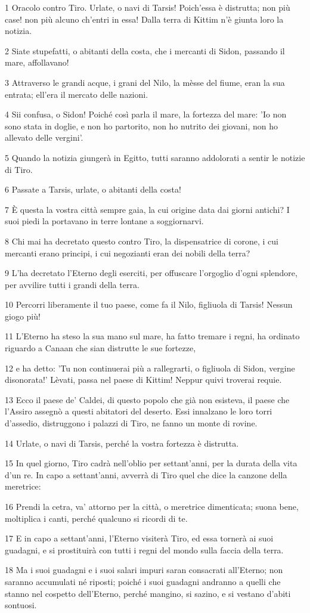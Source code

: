 \par 1 Oracolo contro Tiro. Urlate, o navi di Tarsis! Poich'essa è distrutta; non più case! non più alcuno ch'entri in essa! Dalla terra di Kittim n'è giunta loro la notizia.
\par 2 Siate stupefatti, o abitanti della costa, che i mercanti di Sidon, passando il mare, affollavano!
\par 3 Attraverso le grandi acque, i grani del Nilo, la mèsse del fiume, eran la sua entrata; ell'era il mercato delle nazioni.
\par 4 Sii confusa, o Sidon! Poiché così parla il mare, la fortezza del mare: 'Io non sono stata in doglie, e non ho partorito, non ho nutrito dei giovani, non ho allevato delle vergini'.
\par 5 Quando la notizia giungerà in Egitto, tutti saranno addolorati a sentir le notizie di Tiro.
\par 6 Passate a Tarsis, urlate, o abitanti della costa!
\par 7 È questa la vostra città sempre gaia, la cui origine data dai giorni antichi? I suoi piedi la portavano in terre lontane a soggiornarvi.
\par 8 Chi mai ha decretato questo contro Tiro, la dispensatrice di corone, i cui mercanti erano principi, i cui negozianti eran dei nobili della terra?
\par 9 L'ha decretato l'Eterno degli eserciti, per offuscare l'orgoglio d'ogni splendore, per avvilire tutti i grandi della terra.
\par 10 Percorri liberamente il tuo paese, come fa il Nilo, figliuola di Tarsis! Nessun giogo più!
\par 11 L'Eterno ha steso la sua mano sul mare, ha fatto tremare i regni, ha ordinato riguardo a Canaan che sian distrutte le sue fortezze,
\par 12 e ha detto: 'Tu non continuerai più a rallegrarti, o figliuola di Sidon, vergine disonorata!' Lèvati, passa nel paese di Kittim! Neppur quivi troverai requie.
\par 13 Ecco il paese de' Caldei, di questo popolo che già non esisteva, il paese che l'Assiro assegnò a questi abitatori del deserto. Essi innalzano le loro torri d'assedio, distruggono i palazzi di Tiro, ne fanno un monte di rovine.
\par 14 Urlate, o navi di Tarsis, perché la vostra fortezza è distrutta.
\par 15 In quel giorno, Tiro cadrà nell'oblio per settant'anni, per la durata della vita d'un re. In capo a settant'anni, avverrà di Tiro quel che dice la canzone della meretrice:
\par 16 Prendi la cetra, va' attorno per la città, o meretrice dimenticata; suona bene, moltiplica i canti, perché qualcuno si ricordi di te.
\par 17 E in capo a settant'anni, l'Eterno visiterà Tiro, ed essa tornerà ai suoi guadagni, e si prostituirà con tutti i regni del mondo sulla faccia della terra.
\par 18 Ma i suoi guadagni e i suoi salari impuri saran consacrati all'Eterno; non saranno accumulati né riposti; poiché i suoi guadagni andranno a quelli che stanno nel cospetto dell'Eterno, perché mangino, si sazino, e si vestano d'abiti sontuosi.

